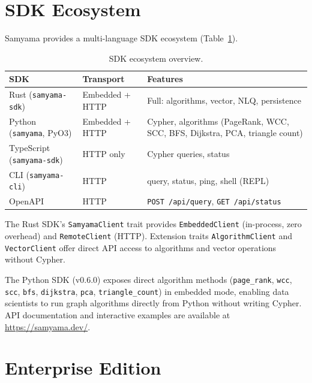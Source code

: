 \documentclass[11pt]{article}
\begin{document}
\section{SDK Ecosystem}

Samyama provides a multi-language SDK ecosystem (Table~\ref{tab:sdks}).

\begin{table}[t]
  \centering
  \caption{SDK ecosystem overview.}
  \label{tab:sdks}
  \begin{tabular}{@{}llp{5.5cm}@{}}
    \toprule
    \textbf{SDK} & \textbf{Transport} & \textbf{Features} \\
    \midrule
    Rust (\texttt{samyama-sdk})      & Embedded + HTTP & Full: algorithms, vector, NLQ, persistence \\
    Python (\texttt{samyama}, PyO3)  & Embedded + HTTP & Cypher, algorithms (PageRank, WCC, SCC, BFS, Dijkstra, PCA, triangle count) \\
    TypeScript (\texttt{samyama-sdk}) & HTTP only      & Cypher queries, status \\
    CLI (\texttt{samyama-cli})       & HTTP            & query, status, ping, shell (REPL) \\
    OpenAPI                          & HTTP            & \texttt{POST /api/query}, \texttt{GET /api/status} \\
    \bottomrule
  \end{tabular}
\end{table}

The Rust SDK's \texttt{SamyamaClient} trait provides \texttt{EmbeddedClient} (in-process, zero overhead) and \texttt{RemoteClient} (HTTP). Extension traits \texttt{AlgorithmClient} and \texttt{VectorClient} offer direct API access to algorithms and vector operations without Cypher.

The Python SDK (v0.6.0) exposes direct algorithm methods (\texttt{page\_rank}, \texttt{wcc}, \texttt{scc}, \texttt{bfs}, \texttt{dijkstra}, \texttt{pca}, \texttt{triangle\_count}) in embedded mode, enabling data scientists to run graph algorithms directly from Python without writing Cypher. API documentation and interactive examples are available at \url{https://samyama.dev/}.

\section{Enterprise Edition}
\end{document}
